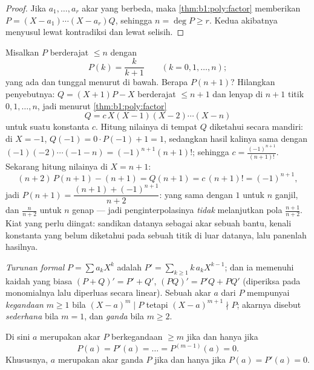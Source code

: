 \begin{proof}
Jika $a_1, \dots, a_r$ akar yang berbeda, maka \cref{thm:b1:poly:factor}
memberikan $P = (X-a_1)\cdots(X-a_r) Q$, sehingga $n = \deg P \geq r$. Kedua
akibatnya menyusul lewat kontradiksi dan lewat selisih.
\end{proof}

\begin{example}\label{ex:b1:poly:auxiliary}
Misalkan $P$  berderajat $\leq n$ dengan
\[
P(k) = \frac{k}{k+1} \qquad (k = 0, 1, \dots, n) ;
\]
yang ada dan tunggal menurut  di bawah. Berapa
$P(n+1)$? Hilangkan penyebutnya:  $Q = (X+1)P - X$ berderajat
$\leq n + 1$ dan lenyap di $n + 1$ titik $0, 1,
\dots, n$, jadi menurut \cref{thm:b1:poly:factor}
\[
Q = c\,X(X-1)(X-2)\cdots(X-n)
\]
untuk suatu konstanta $c$. Hitung nilainya di tempat $Q$ diketahui secara mandiri:
di $X = -1$, $Q(-1) = 0 \cdot P(-1) + 1 = 1$, sedangkan hasil kalinya
sama dengan $(-1)(-2)\cdots(-1-n) = (-1)^{n+1}(n+1)!$; sehingga $c =
\frac{(-1)^{n+1}}{(n+1)!}$. Sekarang hitung nilainya di $X = n + 1$:
\[
(n+2)\,P(n+1) - (n+1) = Q(n+1) = c\,(n+1)! = (-1)^{n+1} ,
\]
jadi $P(n+1) = \dfrac{(n+1) + (-1)^{n+1}}{n+2}$: yang sama dengan $1$ untuk
$n$ ganjil, dan $\frac{n}{n+2}$ untuk $n$ genap --- jadi 
penginterpolasinya \emph{tidak} melanjutkan pola
$\frac{n+1}{n+2}$. Kiat yang perlu diingat: sandikan datanya sebagai
akar sebuah  bantu, kenali konstanta yang belum diketahui
pada sebuah titik di luar datanya, lalu panenlah hasilnya.
\end{example}

\begin{definition}\label{def:b1:poly:derivative}
\emph{Turunan formal} $P = \sum a_k X^k$ adalah $P' = \sum_{k
\geq 1} k\,a_k X^{k-1}$; dan ia memenuhi kaidah yang biasa $(P+Q)' = P' +
Q'$, $(PQ)' = P'Q + PQ'$ (diperiksa pada monomialnya lalu diperluas secara
linear). Sebuah akar $a$ dari $P$ mempunyai
\emph{kegandaan} $m \geq 1$ bila
$(X-a)^m \mid P$ tetapi $(X-a)^{m+1} \nmid P$; akarnya disebut \emph{sederhana}
bila $m = 1$, dan \emph{ganda} bila $m \geq 2$.
\end{definition}

\begin{proposition}\label{prop:b1:poly:multiplicity}
Di sini $a$ merupakan akar $P$ berkegandaan $\geq m$ jika dan hanya jika
\[
P(a) = P'(a) = \dots = P^{(m-1)}(a) = 0 .
\]
Khususnya, $a$ merupakan akar ganda $P$ jika dan hanya jika $P(a) =
P'(a) = 0$.
\end{proposition}

